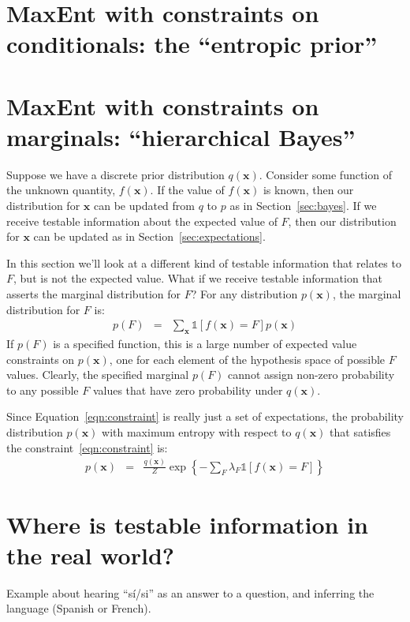 \documentclass[a4paper, 11pt]{article}
\newcommand{\xx}{\boldsymbol{x}}
\begin{document}
\section{MaxEnt with constraints on conditionals: the ``entropic prior''}


\section{MaxEnt with constraints on marginals: ``hierarchical Bayes''}
Suppose we have a discrete prior distribution $q(\xx)$. Consider some
function of the unknown quantity, $f(\xx)$.
If the value of $f(\xx)$ is known, then our distribution for $\xx$ can
be updated from $q$ to $p$ as in Section~\ref{sec:bayes}.
If we receive testable information
about the expected value of $F$, then our distribution for $\xx$ can
be updated as in Section~\ref{sec:expectations}.

In this section we'll look at a different kind of testable information that
relates to $F$, but is not the expected value. What if we receive testable
information that asserts the marginal distribution for $F$?
For any distribution $p(\xx)$, the marginal distribution for $F$ is:
\begin{eqnarray}
p(F) &=& \sum_{\xx}\mathds{1}\left[f(\xx) = F\right]p(\xx)\label{eqn:constraint}
\end{eqnarray}
If $p(F)$ is a specified function, this is a large number of expected
value constraints on $p(\xx)$, one for each element of the hypothesis space
of possible $F$ values. Clearly, the specified marginal $p(F)$ cannot assign
non-zero probability to any possible $F$ values that have zero probability
under $q(\xx)$.

Since Equation~\ref{eqn:constraint} is really just a set of expectations,
the probability distribution
$p(\xx)$ with maximum entropy with respect to $q(\xx)$ that satisfies the
constraint~\ref{eqn:constraint} is:
\begin{eqnarray}
p(\xx) &=& \frac{q(\xx)}{Z}\exp\left\{-\sum_F \lambda_F \mathds{1}
\left[f(\xx) = F\right]  \right\}
\end{eqnarray}


\section{Where is testable information in the real world?}

Example about hearing ``sí/si'' as an answer to a question,
and inferring the language (Spanish or French).
\end{document}
